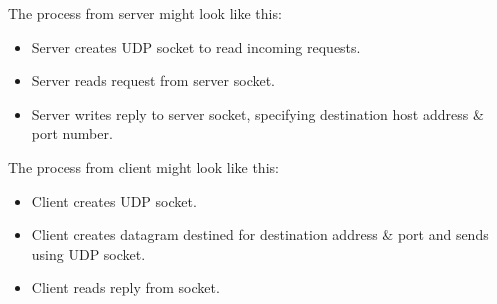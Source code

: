 The process from server might look like this:
\begin{itemize}
    \item Server creates UDP socket to read incoming requests.
    \item Server reads request from server socket.
    \item Server writes reply to server socket, specifying destination host
        address \& port number.
\end{itemize}

The process from client might look like this:
\begin{itemize}
    \item Client creates UDP socket.
    \item Client creates datagram destined for destination address \& port
        and sends using UDP socket.
    \item Client reads reply from socket.
\end{itemize}
